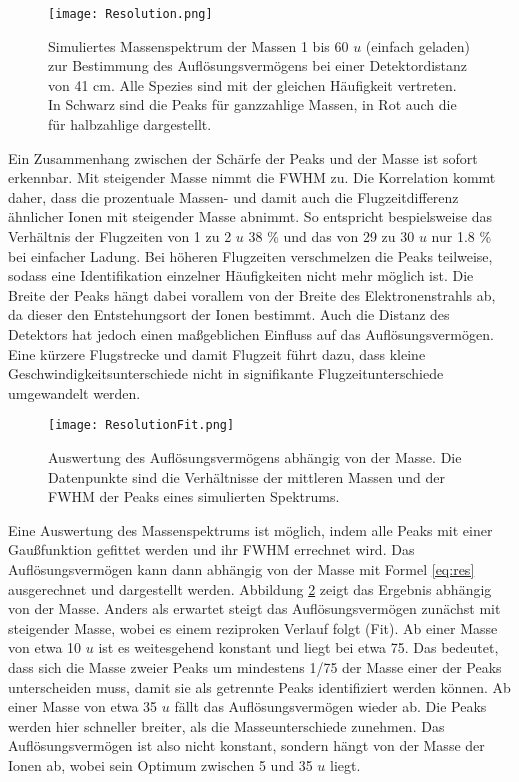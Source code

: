 \begin{figure}
    \centering
    \texttt{[image: Resolution.png]}
    \caption[Simuliertes Massenspektrum (1–60 u, 410 mm) zur Auflösungsbestimmung]{Simuliertes Massenspektrum der Massen 1 bis 60 $u$ (einfach geladen) zur Bestimmung des Auflösungsvermögens bei einer Detektordistanz von 41 cm. Alle Spezies sind mit der gleichen Häufigkeit vertreten. In Schwarz sind die Peaks für ganzzahlige Massen, in Rot auch die für halbzahlige dargestellt.}
    \label{fig:res}
\end{figure}

Ein Zusammenhang zwischen der Schärfe der Peaks und der Masse ist sofort erkennbar. Mit steigender Masse nimmt die FWHM zu. Die Korrelation kommt daher, dass die prozentuale Massen- und damit auch die Flugzeitdifferenz ähnlicher Ionen mit steigender Masse abnimmt. So entspricht bespielsweise das Verhältnis der Flugzeiten von 1 zu 2 $u$ 38 \% und das von 29 zu 30 $u$ nur 1.8 \% bei einfacher Ladung. Bei höheren Flugzeiten verschmelzen die Peaks teilweise, sodass eine Identifikation einzelner Häufigkeiten nicht mehr möglich ist. Die Breite der Peaks hängt dabei vorallem von der Breite des Elektronenstrahls ab, da dieser den Entstehungsort der Ionen bestimmt. Auch die Distanz des Detektors hat jedoch einen maßgeblichen Einfluss auf das Auflösungsvermögen. Eine kürzere Flugstrecke und damit Flugzeit führt dazu, dass kleine Geschwindigkeitsunterschiede nicht in signifikante Flugzeitunterschiede umgewandelt werden.

\begin{figure}
    \centering
    \texttt{[image: ResolutionFit.png]}
    \caption[Auswertung des Auflösungsvermögens abhängig von der Masse (410 mm)]{Auswertung des Auflösungsvermögens abhängig von der Masse. Die Datenpunkte sind die Verhältnisse der mittleren Massen und der FWHM der Peaks eines simulierten Spektrums.}
    \label{fig:res_fit}
\end{figure}

Eine Auswertung des Massenspektrums ist möglich, indem alle Peaks mit einer Gaußfunktion gefittet werden und ihr FWHM errechnet wird. Das Auflösungsvermögen kann dann abhängig von der Masse mit Formel \ref{eq:res} ausgerechnet und dargestellt werden. Abbildung \ref{fig:res_fit} zeigt das Ergebnis abhängig von der Masse. Anders als erwartet steigt das Auflösungsvermögen zunächst mit steigender Masse, wobei es einem reziproken Verlauf folgt (Fit). Ab einer Masse von etwa 10 $u$ ist es weitesgehend konstant und liegt bei etwa 75. Das bedeutet, dass sich die Masse zweier Peaks um mindestens 1/75 der Masse einer der Peaks unterscheiden muss, damit sie als getrennte Peaks identifiziert werden können. Ab einer Masse von etwa 35 $u$ fällt das Auflösungsvermögen wieder ab. Die Peaks werden hier schneller breiter, als die Masseunterschiede zunehmen. Das Auflösungsvermögen ist also nicht konstant, sondern hängt von der Masse der Ionen ab, wobei sein Optimum zwischen 5 und 35 $u$ liegt.

